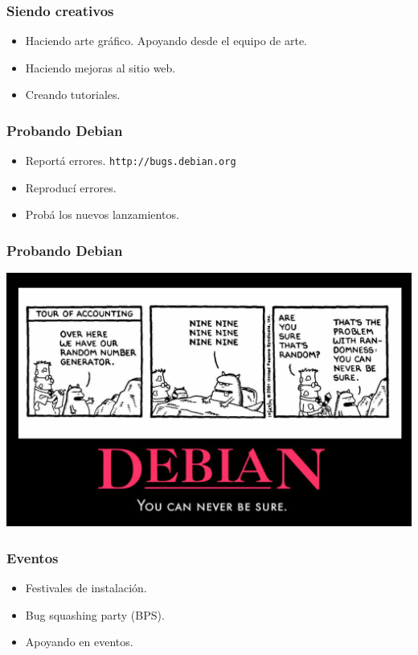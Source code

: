 \documentclass{beamer}
\begin{document}
\begin{frame}

\frametitle{Siendo creativos}
        \begin{itemize}
                \pause \item Haciendo arte gr\'afico. Apoyando desde el equipo de arte.
                \pause \item Haciendo mejoras al sitio web.
                \pause \item Creando tutoriales.
        \end{itemize}

\end{frame}


\begin{frame}
\frametitle{Probando Debian}
        \begin{itemize}
                \pause \item Report\'a errores. \texttt{http://bugs.debian.org}
                \pause \item Reproduc\'i errores.
		\pause \item Prob\'a los nuevos lanzamientos.
        \end{itemize}

\end{frame}

\begin{frame}
\frametitle{Probando Debian}
        \begin{center}
                 \includegraphics[scale=0.15]{../img/ReporteBug.png}
        \end{center}

\end{frame}


\begin{frame}
\frametitle{Eventos}
        \begin{itemize}
                 \pause \item Festivales de instalaci\'on.
		 \pause \item Bug squashing party (BPS).
		 \pause \item Apoyando en eventos.
        \end{itemize}
\end{frame}
\end{document}
